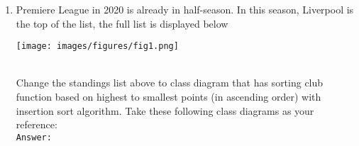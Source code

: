 \documentclass[12pt,titlepage]{article}
\begin{document}
\begin{enumerate}
\begin{enumerate}[label=\arabic*.]
\begin{verbatim}
                }
            }
        \end{verbatim}
        \item Premiere League in 2020 is already in half-season. In this season, Liverpool is the top of the list, the full list is displayed below
        \mbox{}\\
        \begin{center}
            \texttt{[image: images/figures/fig1.png]}
        \end{center}
        \mbox{}\\
        Change the standings list above to class diagram that has sorting club function based on highest to smallest points (in ascending order) with insertion sort algorithm. Take these following class diagrams as your reference:
        \mbox{}\\
        \texttt{Answer: }
        \mbox{}\\
        \mbox{}\\
    \end{enumerate}
\end{enumerate}
\end{document}
